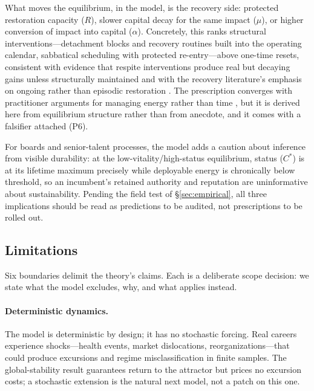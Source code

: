What moves the equilibrium, in the model, is the recovery side: protected
restoration capacity ($R$), slower capital decay for the same impact
($\mu$), or higher conversion of impact into capital ($\alpha$).
Concretely, this ranks structural interventions---detachment blocks and
recovery routines built into the operating calendar, sabbatical
scheduling with protected re-entry---above one-time resets, consistent
with evidence that respite interventions produce real but decaying gains
unless structurally maintained \citep{davidson2010sabbatical} and with the
recovery literature's emphasis on ongoing rather than episodic restoration
\citep{sonnentag2007recovery,sonnentag2022recovery}. The prescription
converges with practitioner arguments for managing energy rather than
time \citep{loehr2003power,schwartz2007manage}, but it is derived here
from equilibrium structure rather than from anecdote, and it comes with a
falsifier attached (P6).

For boards and senior-talent processes, the model adds a caution about
inference from visible durability: at the low-vitality/high-status
equilibrium, status ($C^{*}$) is at its lifetime maximum precisely while
deployable energy is chronically below threshold, so an incumbent's
retained authority and reputation are uninformative about sustainability.
Pending the field test of \S\ref{sec:empirical}, all three implications
should be read as predictions to be audited, not prescriptions to be
rolled out.

\subsection{Limitations}
\label{sec:limitations}

Six boundaries delimit the theory's claims. Each is a deliberate scope
decision: we state what the model excludes, why, and what applies instead.

\paragraph{Deterministic dynamics.} The model is deterministic by design;
it has no stochastic forcing. Real careers experience shocks---health
events, market dislocations, reorganizations---that could produce
excursions and regime misclassification in finite samples. The
global-stability result guarantees return to the attractor but prices no
excursion costs; a stochastic extension is the natural next model, not a
patch on this one.

